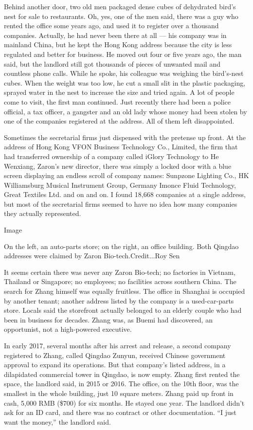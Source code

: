 Behind another door, two old men packaged dense cubes of dehydrated
bird's nest for sale to restaurants. Oh, yes, one of the men said, there
was a guy who rented the office some years ago, and used it to register
over a thousand companies. Actually, he had never been there at all ---
his company was in mainland China, but he kept the Hong Kong address
because the city is less regulated and better for business. He moved out
four or five years ago, the man said, but the landlord still got
thousands of pieces of unwanted mail and countless phone calls. While he
spoke, his colleague was weighing the bird's-nest cubes. When the weight
was too low, he cut a small slit in the plastic packaging, sprayed water
in the nest to increase the size and tried again. A lot of people come
to visit, the first man continued. Just recently there had been a police
official, a tax officer, a gangster and an old lady whose money had been
stolen by one of the companies registered at the address. All of them
left disappointed.

Sometimes the secretarial firms just dispensed with the pretense up
front. At the address of Hong Kong VFON Business Technology Co.,
Limited, the firm that had transferred ownership of a company called
iGlory Technology to He Wenxiang, Zaron's new director, there was simply
a locked door with a blue screen displaying an endless scroll of company
names: Sunpzone Lighting Co., HK Williamsburg Musical Instrument Group,
Germany Imonce Fluid Technology, Great Textiles Ltd. and on and on. I
found 18,668 companies at a single address, but most of the secretarial
firms seemed to have no idea how many companies they actually
represented.

Image

On the left, an auto-parts store; on the right, an office building. Both
Qingdao addresses were claimed by Zaron Bio-tech.Credit...Roy Sen

It seems certain there was never any Zaron Bio-tech; no factories in
Vietnam, Thailand or Singapore; no employees; no facilities across
southern China. The search for Zhang himself was equally fruitless. The
office in Shanghai is occupied by another tenant; another address listed
by the company is a used-car-parts store. Locals said the storefront
actually belonged to an elderly couple who had been in business for
decades. Zhang was, as Buemi had discovered, an opportunist, not a
high-powered executive.

In early 2017, several months after his arrest and release, a second
company registered to Zhang, called Qingdao Zunyun, received Chinese
government approval to expand its operations. But that company's listed
address, in a dilapidated commercial tower in Qingdao, is now empty.
Zhang first rented the space, the landlord said, in 2015 or 2016. The
office, on the 10th floor, was the smallest in the whole building, just
10 square meters. Zhang paid up front in cash, 5,000 RMB (\$700) for six
months. He stayed one year. The landlord didn't ask for an ID card, and
there was no contract or other documentation. ``I just want the money,''
the landlord said.

